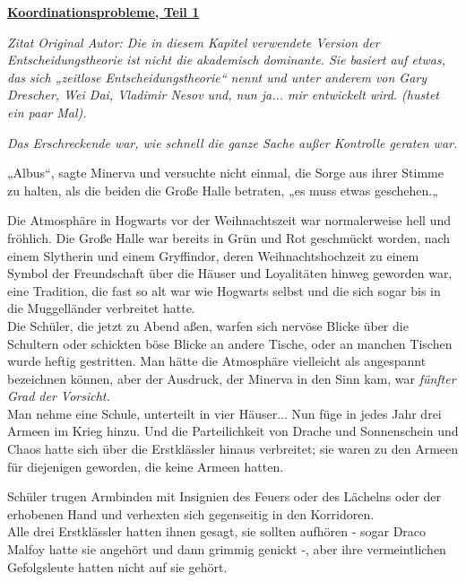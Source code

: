 

\hypertarget{koordinationsprobleme-teil-1}{%

\textbf{\uline{Koordinationsprobleme, Teil 1}}

\hfill\break \emph{Zitat Original Autor: Die in diesem Kapitel verwendete Version der Entscheidungstheorie ist nicht die akademisch dominante. Sie basiert auf etwas, das sich „zeitlose Entscheidungstheorie“ nennt und unter anderem von Gary Drescher, Wei Dai, Vladimir Nesov und, nun ja... mir entwickelt wird. (hustet ein paar Mal).}

\emph{Das Erschreckende war, wie schnell die ganze Sache außer Kontrolle geraten war.}

„Albus“, sagte Minerva und versuchte nicht einmal, die Sorge aus ihrer Stimme zu halten, als die beiden die Große Halle betraten, „es muss etwas geschehen.„

Die Atmosphäre in Hogwarts vor der Weihnachtszeit war normalerweise hell und fröhlich. Die Große Halle war bereits in Grün und Rot geschmückt worden, nach einem Slytherin und einem Gryffindor, deren Weihnachtshochzeit zu einem Symbol der Freundschaft über die Häuser und Loyalitäten hinweg geworden war, eine Tradition, die fast so alt war wie Hogwarts selbst und die sich sogar bis in die Muggelländer verbreitet hatte.\\ Die Schüler, die jetzt zu Abend aßen, warfen sich nervöse Blicke über die Schultern oder schickten böse Blicke an andere Tische, oder an manchen Tischen wurde heftig gestritten. Man hätte die Atmosphäre vielleicht als angespannt bezeichnen können, aber der Ausdruck, der Minerva in den Sinn kam, war \emph{fünfter Grad der Vorsicht.}\\ Man nehme eine Schule, unterteilt in vier Häuser... Nun füge in jedes Jahr drei Armeen im Krieg hinzu. Und die Parteilichkeit von Drache und Sonnenschein und Chaos hatte sich über die Erstklässler hinaus verbreitet; sie waren zu den Armeen für diejenigen geworden, die keine Armeen hatten.

Schüler trugen Armbinden mit Insignien des Feuers oder des Lächelns oder der erhobenen Hand und verhexten sich gegenseitig in den Korridoren.\\ Alle drei Erstklässler hatten ihnen gesagt, sie sollten aufhören - sogar Draco Malfoy hatte sie angehört und dann grimmig genickt -, aber ihre vermeintlichen Gefolgsleute hatten nicht auf sie gehört.

}
